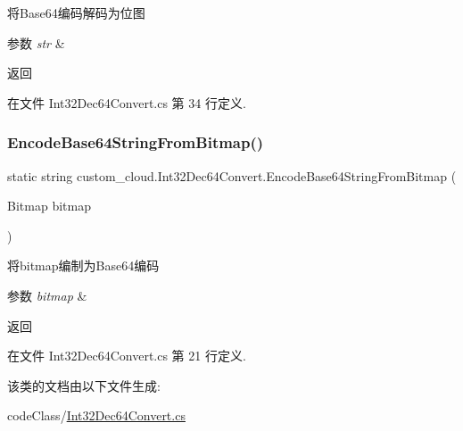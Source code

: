 将\+Base64编码解码为位图 


\begin{DoxyParams}{参数}
{\em str} & \\
\hline
\end{DoxyParams}
\begin{DoxyReturn}{返回}

\end{DoxyReturn}


在文件 Int32\+Dec64\+Convert.\+cs 第 34 行定义.

\mbox{\label{classcustom__cloud_1_1_int32_dec64_convert_a1f39ef67ce8744c91304566d07cbfa29}} 
\subsubsection{\texorpdfstring{Encode\+Base64\+String\+From\+Bitmap()}{EncodeBase64StringFromBitmap()}}
{\footnotesize\ttfamily static string custom\+\_\+cloud.\+Int32\+Dec64\+Convert.\+Encode\+Base64\+String\+From\+Bitmap (\begin{DoxyParamCaption}\item[{Bitmap}]{bitmap }\end{DoxyParamCaption})\hspace{0.3cm}{\ttfamily [static]}}



将bitmap编制为\+Base64编码 


\begin{DoxyParams}{参数}
{\em bitmap} & \\
\hline
\end{DoxyParams}
\begin{DoxyReturn}{返回}

\end{DoxyReturn}


在文件 Int32\+Dec64\+Convert.\+cs 第 21 行定义.



该类的文档由以下文件生成\+:\begin{DoxyCompactItemize}
\item 
code\+Class/\hyperlink{_int32_dec64_convert_8cs}{Int32\+Dec64\+Convert.\+cs}\end{DoxyCompactItemize}
